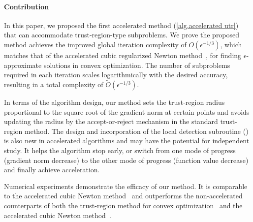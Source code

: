 \documentclass{article}
\theoremstyle{plain}
\theoremstyle{definition}
\theoremstyle{remark}
\begin{document}
\paragraph{Contribution}
In this paper, we proposed the first accelerated method (\cref{alg.accelerated utr}) that can accommodate trust-region-type subproblems. We prove the proposed method achieves the improved global iteration complexity of $O(\epsilon^{-1/3})$, which matches that of the accelerated cubic regularized Newton method~\cite{nesterov2008accelerating}, for finding $\epsilon$-approximate solutions in convex optimization. The number of subproblems required in each iteration scales logarithmically with the desired accuracy, resulting in a total complexity of $\tilde{O}(\epsilon^{-1/3})$.

In terms of the algorithm design, our method sets the trust-region radius proportional to the square root of the gradient norm at certain points and avoids updating the radius by the accept-or-reject mechanism in the standard trust-region method. The design and incorporation of the local detection subroutine () is also new in accelerated algorithms and may have the potential for independent study. It helps the algorithm stop early, or switch from one mode of progress (gradient norm decrease) to the other mode of progress (function value decrease) and finally achieve acceleration.




Numerical experiments demonstrate the efficacy of our method. It is comparable to the accelerated cubic Newton method~\cite{nesterov2008accelerating} and outperforms the non-accelerated counterparts of both the trust-region method for convex optimization~\cite{jiang2024nonconvexityuniversaltrustregionmethod} and the accelerated cubic Newton method~\cite{nesterov2006cubic}.
\end{document}
